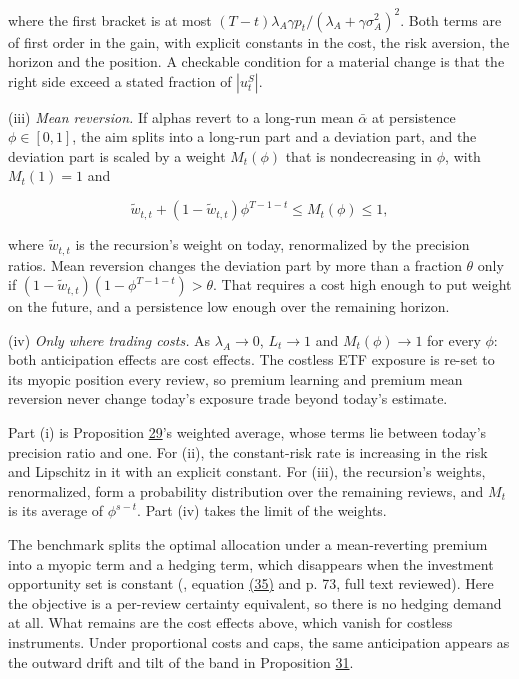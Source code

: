 \documentclass[11pt]{article}
\begin{document}
where the first bracket is at most
\((T-t)\lambda_A\gamma p_t/(\lambda_A+\gamma\sigma_A^2)^2\). Both terms are of first order in
the gain, with explicit constants in the cost, the risk aversion,
the horizon and the position. A checkable condition for a material
change is that the right side exceed a stated fraction of \(|u^S_t|\).

(iii) \emph{Mean reversion.} If alphas revert to a long-run mean
\(\bar\alpha\) at persistence \(\phi\in[0,1]\), the aim splits into a long-run part
and a deviation part, and the deviation part is scaled by a weight
\(M_t(\phi)\) that is nondecreasing in \(\phi\), with \(M_t(1)=1\) and

\begin{equation*}
\tilde w_{t,t}+(1-\tilde w_{t,t})\phi^{T-1-t}\leq M_t(\phi)\leq1,\tag{106}\label{eq:106}
\end{equation*}

where \(\tilde w_{t,t}\) is the recursion's weight on today, renormalized by
the precision ratios. Mean reversion changes the deviation part by more
than a fraction \(\theta\) only if \((1-\tilde w_{t,t})(1-\phi^{T-1-t})>\theta\). That
requires a cost high enough to put weight on the future, and a
persistence low enough over the remaining horizon.

(iv) \emph{Only where trading costs.} As \(\lambda_A\to0\), \(L_t\to1\) and \(M_t(\phi)\to1\)
for every \(\phi\): both anticipation effects are cost effects. The costless
ETF exposure is re-set to its myopic position every review, so premium
learning and premium mean reversion never change today's exposure
trade beyond today's estimate.

Part (i) is Proposition \hyperref[res:Proposition-29]{29}'s weighted average, whose terms lie between
today's precision ratio and one. For (ii), the constant-risk rate is
increasing in the risk and Lipschitz in it with an explicit constant.
For (iii), the recursion's weights, renormalized, form a probability
distribution over the remaining reviews, and \(M_t\) is its average of
\(\phi^{s-t}\). Part (iv) takes the limit of the weights.

The benchmark splits the optimal allocation under a mean-reverting
premium into a myopic term and a hedging term, which disappears when
the investment opportunity set is constant (\cite{wachter2002portfolio},
equation \hyperref[eq:35]{(35)} and p. 73, full text reviewed). Here the objective is a
per-review certainty equivalent, so there is no hedging demand at
all. What remains are the cost effects above, which vanish for
costless instruments. Under proportional costs and caps, the same
anticipation appears as the outward drift and tilt of the band in
Proposition \hyperref[res:Proposition-31]{31}.
\end{document}

